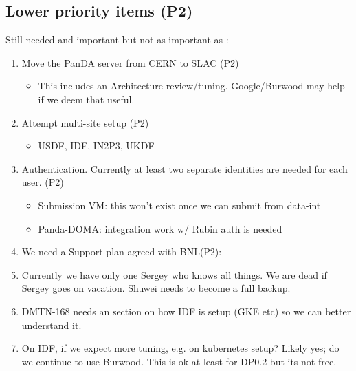 \subsection {Lower priority items (P2)}
Still needed and important but not as important as :
\begin{enumerate}
\item Move the PanDA server from CERN to SLAC  (P2)
\begin{itemize}
\item This includes an Architecture review/tuning.  Google/Burwood may help if we deem that useful.
\end{itemize}
\item Attempt multi-site setup (P2)
\begin{itemize}
\item USDF, IDF, IN2P3, UKDF
\end{itemize}
\item Authentication. Currently at least two separate identities are needed for each user. (P2)
\begin{itemize}
\item Submission VM: this won't exist once we can submit from data-int
\item Panda-DOMA: integration work w/ Rubin auth is needed
\end{itemize}
\item We need a Support plan agreed with BNL(P2):
\item Currently we have only one Sergey who knows all things.  We are dead if Sergey goes on vacation.  Shuwei needs to become a full backup.
\item DMTN-168 needs an section on how IDF is setup (GKE etc) so we can better understand it.
\item On IDF, if  we expect more tuning, e.g. on kubernetes setup? Likely yes; do we continue to use  Burwood. This is ok at least for DP0.2 but its not free.
\end{enumerate}
